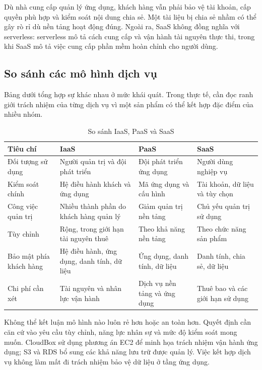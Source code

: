 Dù nhà cung cấp quản lý ứng dụng, khách hàng vẫn phải bảo vệ tài khoản, cấp quyền phù hợp và kiểm soát nội dung chia sẻ. Một tài liệu bị chia sẻ nhầm có thể gây rò rỉ dù nền tảng hoạt động đúng. Ngoài ra, SaaS không đồng nghĩa với serverless: serverless mô tả cách cung cấp và vận hành tài nguyên thực thi, trong khi SaaS mô tả việc cung cấp phần mềm hoàn chỉnh cho người dùng.

\subsection{So sánh các mô hình dịch vụ}
Bảng dưới tổng hợp sự khác nhau ở mức khái quát. Trong thực tế, cần đọc ranh giới trách nhiệm của từng dịch vụ vì một sản phẩm có thể kết hợp đặc điểm của nhiều nhóm.

\begin{table}[htbp]
\centering\small
\caption{So sánh IaaS, PaaS và SaaS}
\begin{tabularx}{\textwidth}{@{}>{\raggedright\arraybackslash}p{2.2cm}XXX@{}}
\toprule
\textbf{Tiêu chí} & \textbf{IaaS} & \textbf{PaaS} & \textbf{SaaS} \\
\midrule
Đối tượng sử dụng & Người quản trị và đội phát triển & Đội phát triển ứng dụng & Người dùng nghiệp vụ \\
Kiểm soát chính & Hệ điều hành khách và ứng dụng & Mã ứng dụng và cấu hình & Tài khoản, dữ liệu và tùy chọn \\
Công việc quản trị & Nhiều thành phần do khách hàng quản lý & Giảm quản trị nền tảng & Chủ yếu quản trị sử dụng \\
Tùy chỉnh & Rộng, trong giới hạn tài nguyên thuê & Theo khả năng nền tảng & Theo chức năng sản phẩm \\
Bảo mật phía khách hàng & Hệ điều hành, ứng dụng, danh tính, dữ liệu & Ứng dụng, danh tính, dữ liệu & Danh tính, chia sẻ, dữ liệu \\
Chi phí cần xét & Tài nguyên và nhân lực vận hành & Dịch vụ nền tảng và ứng dụng & Thuê bao và các giới hạn sử dụng \\
\bottomrule
\end{tabularx}
\end{table}

Không thể kết luận mô hình nào luôn rẻ hơn hoặc an toàn hơn. Quyết định cần căn cứ vào yêu cầu tùy chỉnh, năng lực nhân sự và mức độ kiểm soát mong muốn. CloudBox sử dụng phương án EC2 để minh họa trách nhiệm vận hành ứng dụng; S3 và RDS bổ sung các khả năng lưu trữ được quản lý. Việc kết hợp dịch vụ không làm mất đi trách nhiệm bảo vệ dữ liệu ở tầng ứng dụng.


